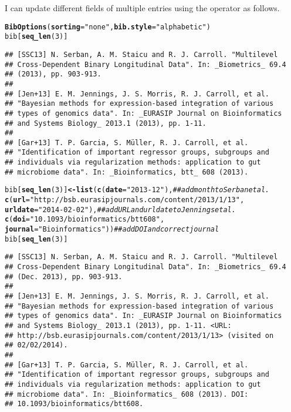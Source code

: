 \documentclass[article]{jss}\usepackage[]{graphicx}\usepackage[]{color}
\makeatletter
\newcommand{\hlnum}[1]{\textcolor[rgb]{0.125,0.125,1}{#1}}%
\newcommand{\hlstr}[1]{\textcolor[rgb]{0.125,0.125,1}{#1}}%
\newcommand{\hlcom}[1]{\textcolor[rgb]{1,0,0.753}{\textit{#1}}}%
\newcommand{\hlstd}[1]{\textcolor[rgb]{0.251,0.251,0.282}{#1}}%
\newcommand{\hlkwb}[1]{\textcolor[rgb]{0.439,0.251,1}{\textbf{#1}}}%
\newcommand{\hlkwc}[1]{\textcolor[rgb]{0.529,0,0.184}{\textbf{#1}}}%
\newcommand{\hlkwd}[1]{\textcolor[rgb]{0.251,0.251,0.282}{\textbf{#1}}}%
\newenvironment{kframe}{%
 \def\at@end@of@kframe{}%
 \ifinner\ifhmode%
  \def\at@end@of@kframe{\end{minipage}}%
  \begin{minipage}{\columnwidth}%
 \fi\fi%
 \def\FrameCommand##1{\hskip\@totalleftmargin \hskip-\fboxsep
 \colorbox{shadecolor}{##1}\hskip-\fboxsep
     \hskip-\linewidth \hskip-\@totalleftmargin \hskip\columnwidth}%
 \MakeFramed {\advance\hsize-\width
   \@totalleftmargin\z@ \linewidth\hsize
   \@setminipage}}%
 {\par\unskip\endMakeFramed%
 \at@end@of@kframe}
\newenvironment{knitrout}{}{} %
\newcommand{\bt}{\`{}}
\makeatother
\begin{document}
I can update different fields of multiple entries using the operator \code{\bt[<-\bt} as follows.  
\begin{knitrout}
\color{fgcolor}\begin{kframe}
\begin{alltt}
\hlkwd{BibOptions}\hlstd{(}\hlkwc{sorting} \hlstd{=} \hlstr{"none"}\hlstd{,} \hlkwc{bib.style} \hlstd{=} \hlstr{"alphabetic"}\hlstd{)}
\hlstd{bib[}\hlkwd{seq_len}\hlstd{(}\hlnum{3}\hlstd{)]}
\end{alltt}
\begin{verbatim}
## [SSC13] N. Serban, A. M. Staicu and R. J. Carroll. "Multilevel
## Cross-Dependent Binary Longitudinal Data". In: _Biometrics_ 69.4
## (2013), pp. 903-913.
## 
## [Jen+13] E. M. Jennings, J. S. Morris, R. J. Carroll, et al.
## "Bayesian methods for expression-based integration of various
## types of genomics data". In: _EURASIP Journal on Bioinformatics
## and Systems Biology_ 2013.1 (2013), pp. 1-11.
## 
## [Gar+13] T. P. Garcia, S. Müller, R. J. Carroll, et al.
## "Identification of important regressor groups, subgroups and
## individuals via regularization methods: application to gut
## microbiome data". In: _Bioinformatics, btt_ 608 (2013).
\end{verbatim}
\begin{alltt}
\hlstd{bib[}\hlkwd{seq_len}\hlstd{(}\hlnum{3}\hlstd{)]} \hlkwb{<-} \hlkwd{list}\hlstd{(}\hlkwd{c}\hlstd{(}\hlkwc{date}\hlstd{=}\hlstr{"2013-12"}\hlstd{),} \hlcom{## add month to Serban et al.}
        \hlkwd{c}\hlstd{(}\hlkwc{url}\hlstd{=}\hlstr{"http://bsb.eurasipjournals.com/content/2013/1/13"}\hlstd{,}
          \hlkwc{urldate} \hlstd{=} \hlstr{"2014-02-02"}\hlstd{),} \hlcom{## add URL and urldate to Jennings et al.}
        \hlkwd{c}\hlstd{(}\hlkwc{doi}\hlstd{=}\hlstr{"10.1093/bioinformatics/btt608"}\hlstd{,}
          \hlkwc{journal} \hlstd{=} \hlstr{"Bioinformatics"}\hlstd{))} \hlcom{## add DOI and correct journal}
\hlstd{bib[}\hlkwd{seq_len}\hlstd{(}\hlnum{3}\hlstd{)]}
\end{alltt}
\begin{verbatim}
## [SSC13] N. Serban, A. M. Staicu and R. J. Carroll. "Multilevel
## Cross-Dependent Binary Longitudinal Data". In: _Biometrics_ 69.4
## (Dec. 2013), pp. 903-913.
## 
## [Jen+13] E. M. Jennings, J. S. Morris, R. J. Carroll, et al.
## "Bayesian methods for expression-based integration of various
## types of genomics data". In: _EURASIP Journal on Bioinformatics
## and Systems Biology_ 2013.1 (2013), pp. 1-11. <URL:
## http://bsb.eurasipjournals.com/content/2013/1/13> (visited on
## 02/02/2014).
## 
## [Gar+13] T. P. Garcia, S. Müller, R. J. Carroll, et al.
## "Identification of important regressor groups, subgroups and
## individuals via regularization methods: application to gut
## microbiome data". In: _Bioinformatics_ 608 (2013). DOI:
## 10.1093/bioinformatics/btt608.
\end{verbatim}
\end{kframe}
\end{knitrout}
\end{document}
